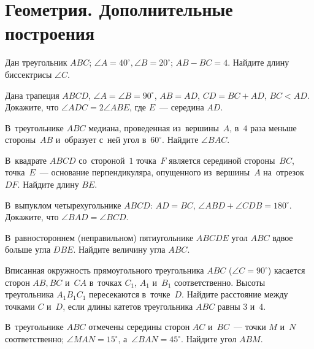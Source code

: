 
\section*{Геометрия. Дополнительные построения}


\begin{problems}

\item
Дан треугольник $ABC$;
$\angle A = 40^{\circ}, \angle B = 20^{\circ}$;
$AB - BC = 4$.
Найдите длину биссектрисы $\angle C$.

\item
Дана трапеция $ABCD$, $\angle A = \angle B = 90^{\circ}$,
$AB = AD$, $CD = BC + AD$, $BC < AD$.
Докажите, что $\angle ADC = 2 \angle ABE$, где $E$~--- середина $AD$.

\item
В~треугольнике $ABC$ медиана, проведенная из~вершины~$A$, в~$4$ раза меньше
стороны~$AB$ и~образует с~ней угол в~$60^{\circ}$.
Найдите $\angle BAC$.

\item
В~квадрате $ABCD$ со~стороной~$1$ точка~$F$ является серединой стороны~$BC$,
точка~$E$~--- основание перпендикуляра, опущенного из~вершины~$A$
на~отрезок~$DF$.
Найдите длину $BE$.

\item
В~выпуклом четырехугольнике $ABCD$:
$AD = BC$, $\angle ABD + \angle CDB = 180^{\circ}$.
Докажите, что $\angle BAD = \angle BCD$.

\item
В~равностороннем (неправильном) пятиугольнике $ABCDE$ угол $ABC$ вдвое больше
угла $DBE$.
Найдите величину угла $ABC$.

\item
Вписанная окружность прямоугольного треугольника $ABC$
($\angle C = 90^{\circ}$) касается сторон $AB, BC$ и~$CA$
в~точках $C_1$, $A_1$ и~$B_1$ соответственно.
Высоты треугольника $A_1 B_1 C_1$ пересекаются в~точке~$D$.
Найдите расстояние между точками $C$ и~$D$, если длины катетов треугольника
$ABC$ равны $3$ и~$4$.

\item
В~треугольнике $ABC$ отмечены середины сторон $AC$ и~$BC$~--- точки $M$ и~$N$
соответственно;
$\angle MAN = 15^{\circ}$, а~$\angle BAN = 45^{\circ}$.
Найдите угол $ABM$.

\end{problems}

